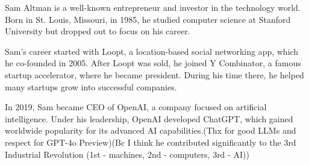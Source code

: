 \documentclass[a4paper,12pt]{article}
\begin{document}
Sam Altman is a well-known entrepreneur and investor in the technology world. Born in St. Louis, Missouri, in 1985, he studied computer science at Stanford University but dropped out to focus on his career.

Sam’s career started with Loopt, a location-based social networking app, which he co-founded in 2005. After Loopt was sold, he joined Y Combinator, a famous startup accelerator, where he became president. During his time there, he helped many startups grow into successful companies.

In 2019, Sam became CEO of OpenAI, a company focused on artificial intelligence. Under his leadership, OpenAI developed ChatGPT, which gained worldwide popularity for its advanced AI capabilities.(Thx for good LLMs and respect for GPT-4o Preview)(Bc I think he contributed significantly to the 3rd Industrial Revolution (1st - machines, 2nd - computers, 3rd - AI))


\vspace{1cm}
\end{document}
